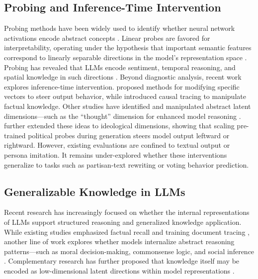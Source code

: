 \documentclass[11pt]{article}
\begin{document}
\subsection{Probing and Inference-Time Intervention}
Probing methods have been widely used to identify whether neural network activations encode abstract concepts \citep{alainUnderstandingIntermediateLayers2016, belinkovProbingClassifiersPromises2022}. Linear probes are favored for interpretability, operating under the hypothesis that important semantic features correspond to linearly separable directions in the model's representation space \citep{mikolov-etal-2013-linguistic, parkLinearRepresentationHypothesis2024}. Probing has revealed that LLMs encode sentiment, temporal reasoning, and spatial knowledge in such directions \citep{tiggesLinearRepresentationsSentiment2023, gurneeLanguageModelsRepresent2023, liInferenceTimeInterventionEliciting2023, goldowsky-dillDetectingStrategicDeception2025}. Beyond diagnostic analysis, recent work explores inference-time intervention. \citet{pmlr-v202-santurkar23a} proposed methods for modifying specific vectors to steer output behavior, while \citet{marksGeometryTruthEmergent2023} introduced causal tracing to manipulate factual knowledge. Other studies have identified and manipulated abstract latent dimensions---such as the ``thought'' dimension for enhanced model reasoning \citep{wangThoughtProbeClassifierGuidedThought2025}. \citet{kimLinearRepresentationsPolitical2025} further extended these ideas to ideological dimensions, showing that scaling pre-trained political probes during generation steers model output leftward or rightward. However, existing evaluations are confined to textual output or persona imitation. It remains under-explored whether these interventions generalize to tasks such as partisan-text rewriting or voting behavior prediction.

\subsection{Generalizable Knowledge in LLMs}
Recent research has increasingly focused on whether the internal representations of LLMs support structured reasoning and generalized knowledge application. While existing studies emphasized factual recall and training document tracing \citep{petroniLanguageModelsKnowledge2019, huangSurveyHallucinationLarge2025}, another line of work explores whether models internalize abstract reasoning patterns---such as moral decision-making, commonsense logic, and social inference \citep{ganguliCapacityMoralSelfCorrection2023, sapSocialBiasFrames2020}. Complementary research has further proposed that knowledge itself may be encoded as low-dimensional latent directions within model representations \citep{ju-etal-2024-large}.
\end{document}
